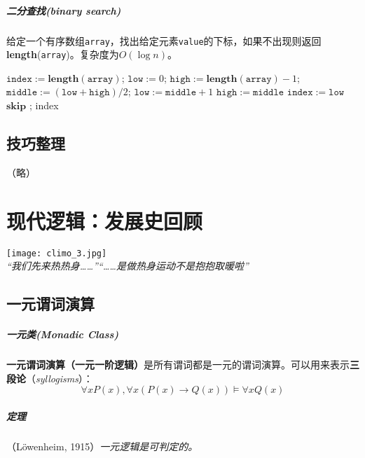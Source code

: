 \documentclass[b5paper,oneside]{ctexbook}
\newcommand{\kw}[1]{\mathbf{#1}}
\begin{document}
\paragraph{二分查找(binary search)}给定一个有序数组\texttt{array}，找出给定元素\texttt{value}的下标，如果不出现则返回\textbf{length}(\texttt{array})。复杂度为$O(\log n)$。
\begin{algorithmic}
			\State $\mathtt{index} := \kw{length}(\mathtt{array})$;
			\State $\mathtt{low} := 0$;
			\State $\mathtt{high} := \kw{length}(\mathtt{array}) - 1$;
				\State $\mathtt{middle} := (\mathtt{low} + \mathtt{high}) / 2$;
					\State $\mathtt{low} := \mathtt{middle} + 1$
				\Else
					\State $\mathtt{high} := \mathtt{middle}$
				\Fi
			\WhileDone
				\State $\mathtt{index} := \mathtt{low}$
			\Else
				\State $\kw{skip}$
			\Fi;
			\Ret index
\end{algorithmic}
\section{技巧整理}
（略）
\chapter{现代逻辑：发展史回顾}
\vspace*{\fill}
\begin{center}
\texttt{[image: climo\_3.jpg]}
\\\emph{“我们先来热热身……”“……是做热身运动不是抱抱取暖啦”}
\end{center}
\vspace*{\fill}
\clearpage
\section{一元谓词演算}
\paragraph{一元类(Monadic Class)}\textbf{一元谓词演算（一元一阶逻辑）}是所有谓词都是一元的谓词演算。可以用来表示\textbf{三段论}（\textit{syllogisms}）：
\[\forall x P(x),\forall x(P(x)\to Q(x))\models \forall x Q(x)\]
\paragraph{定理}（L\"owenheim, 1915）\textit{一元逻辑是可判定的。}
\end{document}
